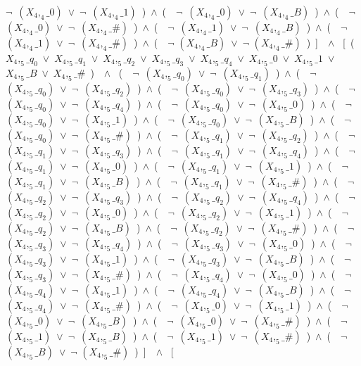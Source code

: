 ﻿\documentclass[a4paper,10pt]{article}
\begin{document}
$\neg$\ $(X_4,_4\_0)$\ $\vee$\ $\neg$\ $(X_4,_4\_1)$\ )\ $\wedge$\ (\ \ $\neg$\ $(X_4,_4\_0)$\ $\vee$\ $\neg$\ $(X_4,_4\_B)$\ )\ $\wedge$\ (\ \ $\neg$\ $(X_4,_4\_0)$\ $\vee$\ $\neg$\ $(X_4,_4\_\#)$\ )\ $\wedge$\ (\ \ $\neg$\ $(X_4,_4\_1)$\ $\vee$\ $\neg$\ $(X_4,_4\_B)$\ )\ $\wedge$\ (\ \ $\neg$\ $(X_4,_4\_1)$\ $\vee$\ $\neg$\ $(X_4,_4\_\#)$\ )\ $\wedge$\ (\ \ $\neg$ $(X_4,_4\_B)$\ $\vee$\ $\neg$ $(X_4,_4\_\#)$\ )\ ]\ \ $\wedge$ \ [\ (\ $X_4,_5\_q_0$\ $\vee$\ $X_4,_5\_q_1$\ $\vee$\ $X_4,_5\_q_2$\ $\vee$\ $X_4,_5\_q_3$\ $\vee$\ $X_4,_5\_q_4$\ $\vee$\ $X_4,_5\_0$\ $\vee$\ $X_4,_5\_1$\ $\vee$\ $X_4,_5\_B$\ $\vee$\ $X_4,_5\_\#$\ )\ \ $\wedge$ \ (\ \ $\neg$\ $(X_4,_5\_q_0)$\ $\vee$\ $\neg$\ $(X_4,_5\_q_1)$\ )\ $\wedge$\ (\ \ $\neg$\ $(X_4,_5\_q_0)$\ $\vee$\ $\neg$\ $(X_4,_5\_q_2)$\ )\ $\wedge$\ (\ \ $\neg$\ $(X_4,_5\_q_0)$\ $\vee$\ $\neg$\ $(X_4,_5\_q_3)$\ )\ $\wedge$\ (\ \ $\neg$\ $(X_4,_5\_q_0)$\ $\vee$\ $\neg$\ $(X_4,_5\_q_4)$\ )\ $\wedge$\ (\ \ $\neg$\ $(X_4,_5\_q_0)$\ $\vee$\ $\neg$\ $(X_4,_5\_0)$\ )\ $\wedge$\ (\ \ $\neg$\ $(X_4,_5\_q_0)$\ $\vee$\ $\neg$\ $(X_4,_5\_1)$\ )\ $\wedge$\ (\ \ $\neg$\ $(X_4,_5\_q_0)$\ $\vee$\ $\neg$\ $(X_4,_5\_B)$\ )\ $\wedge$\ (\ \ $\neg$\ $(X_4,_5\_q_0)$\ $\vee$\ $\neg$\ $(X_4,_5\_\#)$\ )\ $\wedge$\ (\ \ $\neg$\ $(X_4,_5\_q_1)$\ $\vee$\ $\neg$\ $(X_4,_5\_q_2)$\ )\ $\wedge$\ (\ \ $\neg$\ $(X_4,_5\_q_1)$\ $\vee$\ $\neg$\ $(X_4,_5\_q_3)$\ )\ $\wedge$\ (\ \ $\neg$\ $(X_4,_5\_q_1)$\ $\vee$\ $\neg$\ $(X_4,_5\_q_4)$\ )\ $\wedge$\ (\ \ $\neg$\ $(X_4,_5\_q_1)$\ $\vee$\ $\neg$\ $(X_4,_5\_0)$\ )\ $\wedge$\ (\ \ $\neg$\ $(X_4,_5\_q_1)$\ $\vee$\ $\neg$\ $(X_4,_5\_1)$\ )\ $\wedge$\ (\ \ $\neg$\ $(X_4,_5\_q_1)$\ $\vee$\ $\neg$\ $(X_4,_5\_B)$\ )\ $\wedge$\ (\ \ $\neg$\ $(X_4,_5\_q_1)$\ $\vee$\ $\neg$\ $(X_4,_5\_\#)$\ )\ $\wedge$\ (\ \ $\neg$\ $(X_4,_5\_q_2)$\ $\vee$\ $\neg$\ $(X_4,_5\_q_3)$\ )\ $\wedge$\ (\ \ $\neg$\ $(X_4,_5\_q_2)$\ $\vee$\ $\neg$\ $(X_4,_5\_q_4)$\ )\ $\wedge$\ (\ \ $\neg$\ $(X_4,_5\_q_2)$\ $\vee$\ $\neg$\ $(X_4,_5\_0)$\ )\ $\wedge$\ (\ \ $\neg$\ $(X_4,_5\_q_2)$\ $\vee$\ $\neg$\ $(X_4,_5\_1)$\ )\ $\wedge$\ (\ \ $\neg$\ $(X_4,_5\_q_2)$\ $\vee$\ $\neg$\ $(X_4,_5\_B)$\ )\ $\wedge$\ (\ \ $\neg$\ $(X_4,_5\_q_2)$\ $\vee$\ $\neg$\ $(X_4,_5\_\#)$\ )\ $\wedge$\ (\ \ $\neg$\ $(X_4,_5\_q_3)$\ $\vee$\ $\neg$\ $(X_4,_5\_q_4)$\ )\ $\wedge$\ (\ \ $\neg$\ $(X_4,_5\_q_3)$\ $\vee$\ $\neg$\ $(X_4,_5\_0)$\ )\ $\wedge$\ (\ \ $\neg$\ $(X_4,_5\_q_3)$\ $\vee$\ $\neg$\ $(X_4,_5\_1)$\ )\ $\wedge$\ (\ \ $\neg$\ $(X_4,_5\_q_3)$\ $\vee$\ $\neg$\ $(X_4,_5\_B)$\ )\ $\wedge$\ (\ \ $\neg$\ $(X_4,_5\_q_3)$\ $\vee$\ $\neg$\ $(X_4,_5\_\#)$\ )\ $\wedge$\ (\ \ $\neg$\ $(X_4,_5\_q_4)$\ $\vee$\ $\neg$\ $(X_4,_5\_0)$\ )\ $\wedge$\ (\ \ $\neg$\ $(X_4,_5\_q_4)$\ $\vee$\ $\neg$\ $(X_4,_5\_1)$\ )\ $\wedge$\ (\ \ $\neg$\ $(X_4,_5\_q_4)$\ $\vee$\ $\neg$\ $(X_4,_5\_B)$\ )\ $\wedge$\ (\ \ $\neg$\ $(X_4,_5\_q_4)$\ $\vee$\ $\neg$\ $(X_4,_5\_\#)$\ )\ $\wedge$\ (\ \ $\neg$\ $(X_4,_5\_0)$\ $\vee$\ $\neg$\ $(X_4,_5\_1)$\ )\ $\wedge$\ (\ \ $\neg$\ $(X_4,_5\_0)$\ $\vee$\ $\neg$\ $(X_4,_5\_B)$\ )\ $\wedge$\ (\ \ $\neg$\ $(X_4,_5\_0)$\ $\vee$\ $\neg$\ $(X_4,_5\_\#)$\ )\ $\wedge$\ (\ \ $\neg$\ $(X_4,_5\_1)$\ $\vee$\ $\neg$\ $(X_4,_5\_B)$\ )\ $\wedge$\ (\ \ $\neg$\ $(X_4,_5\_1)$\ $\vee$\ $\neg$\ $(X_4,_5\_\#)$\ )\ $\wedge$\ (\ \ $\neg$ $(X_4,_5\_B)$\ $\vee$\ $\neg$ $(X_4,_5\_\#)$\ )\ ]\ \ $\wedge$ \ [\ 
\end{document}
